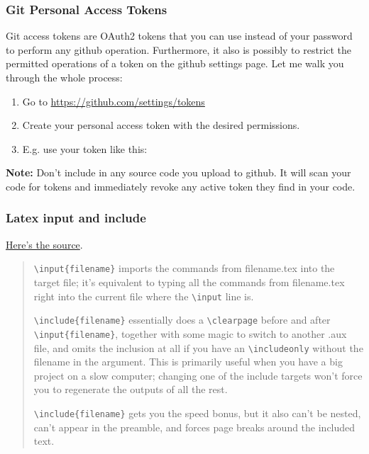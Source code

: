 \documentclass{article}
\begin{document}
\subsubsection{Git Personal Access Tokens}
Git access tokens are OAuth2 tokens that you can use instead of your password to perform any github operation. Furthermore, it also is possibly to restrict the permitted operations of a token on the github settings page. Let me walk you through the whole process:

\bigskip

\begin{enumerate}
	\item Go to \href{https://github.com/settings/tokens}{https://github.com/settings/tokens}
	\item Create your personal access token with the desired permissions.
	\item E.g. use your token like this: 
\end{enumerate}

\textbf{Note:} Don't include in any source code you upload to github. It will scan your code for tokens and immediately revoke any active token they find in your code.

\subsubsection{Latex input and include}

\href{https://tex.stackexchange.com/questions/246/when-should-i-use-input-vs-include}{Here's the source}.

\begin{quotation}
	\texttt{\textbackslash input\{filename\}} imports the commands from filename.tex into the target file; it's equivalent to typing all the commands from filename.tex right into the current file where the \texttt{\textbackslash input} line is.
	
	\bigskip
	
	\texttt{\textbackslash include\{filename\}} essentially does a \texttt{\textbackslash clearpage} before and after \texttt{\textbackslash input\{filename\}}, together with some magic to switch to another .aux file, and omits the inclusion at all if you have an \texttt{\textbackslash includeonly} without the filename in the argument. This is primarily useful when you have a big project on a slow computer; changing one of the include targets won't force you to regenerate the outputs of all the rest.
	
	\bigskip
	
	\texttt{\textbackslash include\{filename\}} gets you the speed bonus, but it also can't be nested, can't appear in the preamble, and forces page breaks around the included text.
\end{quotation}
\end{document}
